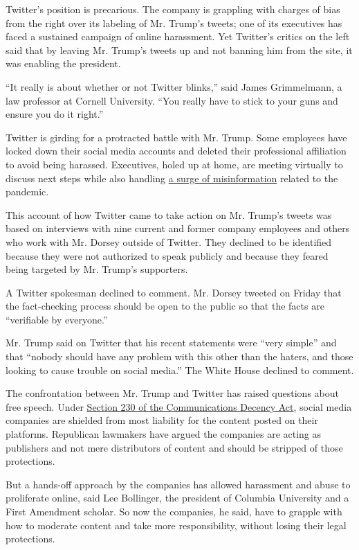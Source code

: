 Twitter's position is precarious. The company is grappling with charges
of bias from the right over its labeling of Mr. Trump's tweets; one of
its executives has faced a sustained campaign of online harassment. Yet
Twitter's critics on the left said that by leaving Mr. Trump's tweets up
and not banning him from the site, it was enabling the president.

``It really is about whether or not Twitter blinks,'' said James
Grimmelmann, a law professor at Cornell University. ``You really have to
stick to your guns and ensure you do it right.''

Twitter is girding for a protracted battle with Mr. Trump. Some
employees have locked down their social media accounts and deleted their
professional affiliation to avoid being harassed. Executives, holed up
at home, are meeting virtually to discuss next steps while also handling
\href{https://www.nytimes3xbfgragh.onion/2020/03/08/technology/coronavirus-misinformation-social-media.html}{a
surge of misinformation} related to the pandemic.

This account of how Twitter came to take action on Mr. Trump's tweets
was based on interviews with nine current and former company employees
and others who work with Mr. Dorsey outside of Twitter. They declined to
be identified because they were not authorized to speak publicly and
because they feared being targeted by Mr. Trump's supporters.

A Twitter spokesman declined to comment. Mr. Dorsey tweeted on Friday
that the fact-checking process should be open to the public so that the
facts are ``verifiable by everyone.''

Mr. Trump said on Twitter that his recent statements were ``very
simple'' and that ``nobody should have any problem with this other than
the haters, and those looking to cause trouble on social media.'' The
White House declined to comment.

The confrontation between Mr. Trump and Twitter has raised questions
about free speech. Under
\href{https://www.nytimes3xbfgragh.onion/2020/05/28/business/section-230-internet-speech.html}{Section
230 of the Communications Decency Act}, social media companies are
shielded from most liability for the content posted on their platforms.
Republican lawmakers have argued the companies are acting as publishers
and not mere distributors of content and should be stripped of those
protections.

But a hands-off approach by the companies has allowed harassment and
abuse to proliferate online, said Lee Bollinger, the president of
Columbia University and a First Amendment scholar. So now the companies,
he said, have to grapple with how to moderate content and take more
responsibility, without losing their legal protections.

